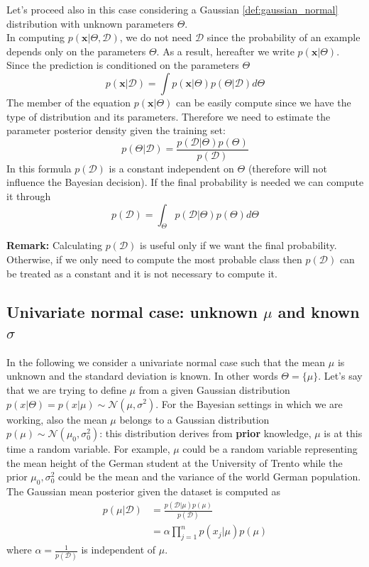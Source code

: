 Let's proceed also in this case considering a Gaussian \ref{def:gaussian_normal}
distribution with unknown parameters $\Theta$.\\ In computing
$p(\pmb{x}| \Theta, \mathcal{D})$, we do not need $\mathcal{D}$ since the probability
of an example depends only on the parameters $\Theta$. As a result, hereafter we
write $p(\pmb{x}|\Theta)$. Since the prediction is conditioned on the parameters
$\Theta$
\[
	p(\pmb{x}|\mathcal{D}) = \int p(\pmb{x}|\Theta)p(\Theta|\mathcal{D})d\Theta
\]
The member of the equation $p(\pmb{x}|\Theta)$ can be easily compute since we
have the type of distribution and its parameters. Therefore we need to estimate the
parameter posterior density given the training set:
\[
	p(\Theta|\mathcal{D}) = \frac{p(\mathcal{D}|\Theta)p(\Theta)}{p(\mathcal{D})}
\]
In this formula $p(\mathcal{D})$ is a constant independent on $\Theta$ (therefore
will not influence the Bayesian decision). If the final probability is needed we
can compute it through
\[
	p(\mathcal{D}) = \int_{\Theta}p(\mathcal{D}|\Theta)p(\Theta)d\Theta
\]

\textbf{Remark:} Calculating $p(\mathcal{D})$ is useful only if we want the final
probability. Otherwise, if we only need to compute the most probable class then $p
(\mathcal{D})$ can be treated as a constant and it is not necessary to compute it.

\subsection{Univariate normal case: unknown \texorpdfstring{$\mu$}{u} and known \texorpdfstring{$\sigma$}{s}}
In the following we consider a univariate normal case such that the mean $\mu$ is
unknown and the standard deviation is known. In other words $\Theta = \{ \mu \}$.
Let's say that we are trying to define $\mu$ from a given Gaussian distribution $p
(x|\Theta) = p(x|\mu) \sim \mathcal{N}(\mu, \sigma^{2})$. For the Bayesian
settings in which we are working, also the mean $\mu$ belongs to a Gaussian distribution
$p(\mu) \sim \mathcal{N}(\mu_{0}, \sigma_{0}^{2})$: this distribution derives
from \textbf{prior} knowledge, $\mu$ is at this time a random variable. For example,
$\mu$ could be a random variable representing the mean height of the German
student at the University of Trento while the prior $\mu_{0}, \sigma^{2}_{0}$
could be the mean and the variance of the world German population.\\ The
Gaussian mean posterior given the dataset is computed as
\begin{align*}
	p(\mu|\mathcal{D}) & = \frac{p(\mathcal{D}|\mu)p(\mu)}{p(\mathcal{D})} \\
	                   & = \alpha \prod_{j=1}^{n}p(x_{j}|\mu)p(\mu)
\end{align*}
where $\alpha = \frac{1}{p(\mathcal{D})}$ is independent of $\mu$.\\

